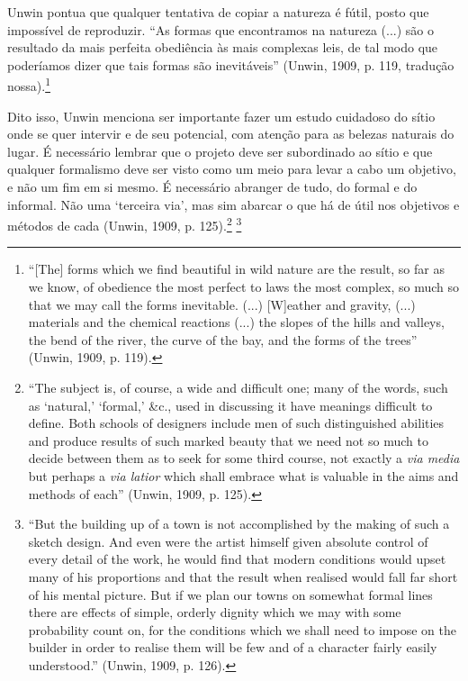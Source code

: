 \documentclass[12pt, a4paper]{book} %
\begin{document}
        Unwin pontua que qualquer tentativa de copiar a natureza é fútil, posto que impossível de reproduzir. ``As formas que encontramos na natureza (...) são o resultado da mais perfeita obediência às mais complexas leis, de tal modo que poderíamos dizer que tais formas são inevitáveis'' (Unwin, 1909, p. 119, tradução nossa).\footnote[12]{``[The] forms which we find beautiful in wild nature are the result, so far as we know, of obedience the most perfect to laws the most complex, so much so that we may call the forms inevitable. (...) [W]eather and gravity, (...) materials and the chemical reactions (...) the slopes of the hills and valleys, the bend of the river, the curve of the bay, and the forms of the trees'' (Unwin, 1909, p. 119).}

        Dito isso, Unwin menciona ser importante fazer um estudo cuidadoso do sítio onde se quer intervir e de seu potencial, com atenção para as belezas naturais do lugar. É necessário lembrar que o projeto deve ser subordinado ao sítio e que qualquer formalismo deve ser visto como um meio para levar a cabo um objetivo, e não um fim em si mesmo. É necessário abranger de tudo, do formal e do informal. Não uma `terceira via', mas sim abarcar o que há de útil nos objetivos e métodos de cada (Unwin, 1909, p. 125).\footnote[13]{``The subject is, of course, a wide and difficult one; many of the words, such as `natural,' `formal,' \&c., used in discussing it have meanings difficult to define. Both schools of designers include men of such distinguished abilities and produce results of such marked beauty that we need not so much to decide between them as to seek for some third course, not exactly a \textit{via media} but perhaps a \textit{via latior} which shall embrace what is valuable in the aims and methods of each'' (Unwin, 1909, p. 125).} 
        \footnote[14]{``But the building up of a town is not accomplished by the making of such a sketch design. And even were the artist himself given absolute control of every detail of the work, he would find that modern conditions would upset many of his proportions and that the result when realised would fall far short of his mental picture. But if we plan our towns on somewhat formal lines there are effects of simple, orderly dignity which we may with some probability count on, for the conditions which we shall need to impose on the builder in order to realise them will be few and of a character fairly easily understood.'' (Unwin, 1909, p. 126).}
\end{document}
